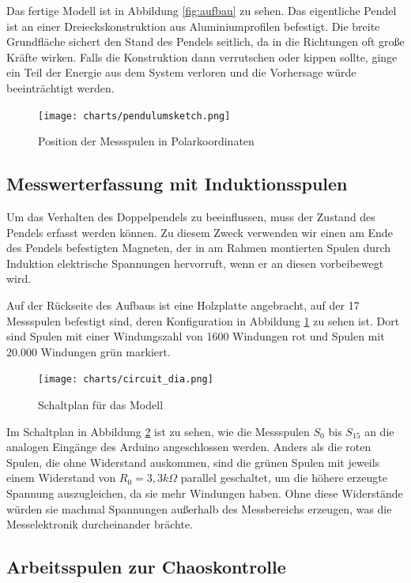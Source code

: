 Das fertige Modell ist in Abbildung \ref{fig:aufbau} zu sehen.
Das eigentliche Pendel ist an einer Dreieckskonstruktion aus Aluminiumprofilen befestigt.
Die breite Grundfläche sichert den Stand des Pendels seitlich, da in die Richtungen oft große Kräfte wirken.
Falls die Konstruktion dann verrutschen oder kippen sollte, ginge ein Teil der Energie aus dem System verloren und die Vorhersage würde beeinträchtigt werden.

\begin{figure}[Hbt]
  \centering
  \texttt{[image: charts/pendulumsketch.png]}
  \caption{Position der Messspulen in Polarkoordinaten}
  \label{fig:pendulumsketch}
\end{figure}

\subsection{Messwerterfassung mit Induktionsspulen}

Um das Verhalten des Doppelpendels zu beeinflussen, muss der Zustand des Pendels erfasst werden können.
Zu diesem Zweck verwenden wir einen am Ende des Pendels befestigten Magneten, der in am Rahmen montierten Spulen durch Induktion elektrische Spannungen hervorruft, wenn er an diesen vorbeibewegt wird.

Auf der Rückseite des Aufbaus ist eine Holzplatte angebracht, auf der 17 Messspulen befestigt sind, deren Konfiguration in Abbildung \ref{fig:pendulumsketch} zu sehen ist.
Dort sind Spulen mit einer Windungszahl von 1600 Windungen rot und Spulen mit 20.000 Windungen grün markiert.

\begin{figure}[bht]
  \centering
  \texttt{[image: charts/circuit\_dia.png]}
  \caption{Schaltplan für das Modell}
  \label{fig:circuit}
\end{figure}

Im Schaltplan in Abbildung \ref{fig:circuit} ist zu sehen, wie die Messspulen $S_0$ bis $S_{15}$ an die analogen Eingänge des Arduino angeschlossen werden.
Anders als die roten Spulen, die ohne Widerstand auskommen, sind die grünen Spulen mit jeweils einem Widerstand von $R_0 = 3,3 k\Omega$ parallel geschaltet, um die höhere erzeugte Spannung auszugleichen, da sie mehr Windungen haben.
Ohne diese Widerstände würden sie machmal Spannungen außerhalb des Messbereichs erzeugen, was die Messelektronik durcheinander brächte.

\subsection{Arbeitsspulen zur Chaoskontrolle}

